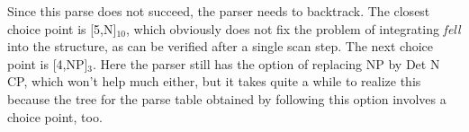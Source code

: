 \begin{examplebox}
    \begin{center}
        \footnotesize
    \end{center}
    Since this parse does not succeed, the parser needs to backtrack.
    The closest choice point is [5,\psep N]$_{10}$, which obviously does not fix the problem of integrating \emph{fell} into the structure, as can be verified after a single scan step.
    The next choice point is [4,\psep NP]$_3$.
    Here the parser still has the option of replacing NP by Det N CP, which won't help much either, but it takes quite a while to realize this because the tree for the parse table obtained by following this option involves a choice point, too.
    \begin{center}
        \footnotesize

\end{center}
\end{examplebox}
